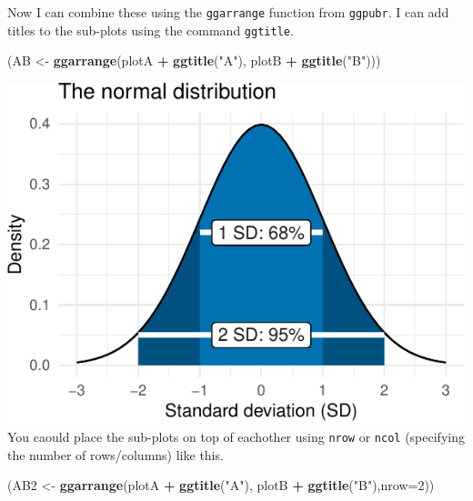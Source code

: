 \documentclass[
  a4paperpaper,
]{book}
\newenvironment{Shaded}{\begin{snugshade}}{\end{snugshade}}
\newcommand{\DataTypeTok}[1]{\textcolor[rgb]{0.13,0.29,0.53}{#1}}
\newcommand{\DecValTok}[1]{\textcolor[rgb]{0.00,0.00,0.81}{#1}}
\newcommand{\KeywordTok}[1]{\textcolor[rgb]{0.13,0.29,0.53}{\textbf{#1}}}
\newcommand{\NormalTok}[1]{#1}
\newcommand{\OperatorTok}[1]{\textcolor[rgb]{0.81,0.36,0.00}{\textbf{#1}}}
\newcommand{\StringTok}[1]{\textcolor[rgb]{0.31,0.60,0.02}{#1}}
\begin{document}
Now I can combine these using the \texttt{ggarrange} function from \texttt{ggpubr}. I can add titles to the sub-plots using the command \texttt{ggtitle}.

\begin{Shaded}
\begin{Highlighting}[]
\NormalTok{(AB \textless{}{-}}\StringTok{ }\KeywordTok{ggarrange}\NormalTok{(plotA }\OperatorTok{+}\StringTok{ }\KeywordTok{ggtitle}\NormalTok{(}\StringTok{"A"}\NormalTok{), plotB }\OperatorTok{+}\StringTok{ }\KeywordTok{ggtitle}\NormalTok{(}\StringTok{"B"}\NormalTok{)))}
\end{Highlighting}
\end{Shaded}

\includegraphics{BB852_files/figure-latex/unnamed-chunk-130-1.pdf}
You caould place the sub-plots on top of eachother using \texttt{nrow} or \texttt{ncol} (specifying the number of rows/columns) like this.

\begin{Shaded}
\begin{Highlighting}[]
\NormalTok{(AB2 \textless{}{-}}\StringTok{ }\KeywordTok{ggarrange}\NormalTok{(plotA }\OperatorTok{+}\StringTok{ }\KeywordTok{ggtitle}\NormalTok{(}\StringTok{"A"}\NormalTok{), plotB }\OperatorTok{+}\StringTok{ }\KeywordTok{ggtitle}\NormalTok{(}\StringTok{"B"}\NormalTok{),}\DataTypeTok{nrow=}\DecValTok{2}\NormalTok{))}
\end{Highlighting}
\end{Shaded}
\end{document}
